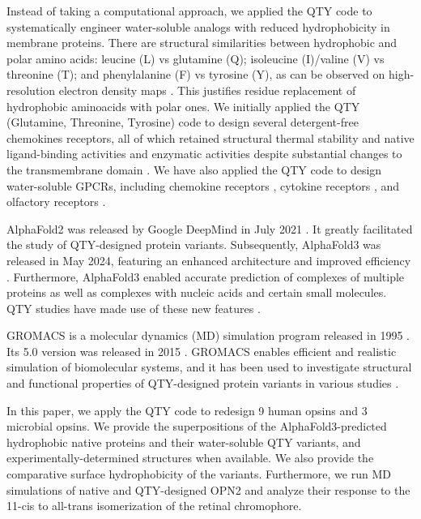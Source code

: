 \documentclass[fleqn,10pt,lineno]{manuscript}
\begin{document}
Instead of taking a computational approach, we applied the QTY code to systematically engineer water-soluble analogs with reduced hydrophobicity in membrane proteins. There are structural similarities between hydrophobic and polar amino acids: leucine (L) vs glutamine (Q); isoleucine (I)/valine (V) vs threonine (T); and phenylalanine (F) vs tyrosine (Y), as can be observed on high-resolution electron density maps \citep{Zhang_2018, Zhang_2022, Tegler_2020}. This justifies residue replacement of hydrophobic aminoacids with polar ones. We initially applied the QTY (Glutamine, Threonine, Tyrosine) code to design several detergent-free chemokines receptors, all of which retained structural thermal stability and native ligand-binding activities and enzymatic activities despite substantial changes to the transmembrane domain \citep{Zhang_2018, Tegler_2020}. We have also applied the QTY code to design water-soluble GPCRs, including chemokine receptors \citep{Zhang_2018, Qing_2019, Tegler_2020, Skuhersky_2021}, cytokine receptors \citep{Hao_2020}, and olfactory receptors \citep{Skuhersky_2021, Johnsson_2025}. 

AlphaFold2 was released by Google DeepMind in July 2021 \citep{Jumper_2021}. It greatly facilitated the study of QTY-designed protein variants. Subsequently, AlphaFold3 was released in May 2024, featuring an enhanced architecture and improved efficiency \citep{Abramson_2024}. Furthermore, AlphaFold3 enabled accurate prediction of complexes of multiple proteins as well as complexes with nucleic acids and certain small molecules. QTY studies have made use of these new features \citep{Chen_2025, Johnsson_2025}. 

GROMACS is a molecular dynamics (MD) simulation program released in 1995 \citep{Berendsen_1995}. Its 5.0 version was released in 2015 \citep{Abraham_2015}. GROMACS enables efficient and realistic simulation of biomolecular systems, and it has been used to investigate structural and functional properties of QTY-designed protein variants in various studies \citep{Karagol_2024, Li_Tang_2024, Smorodina_2024, Li_Wang_2024, Johnsson_2025}. 

In this paper, we apply the QTY code to redesign 9 human opsins and 3 microbial opsins. We provide the superpositions of the AlphaFold3-predicted hydrophobic native proteins and their water-soluble QTY variants, and experimentally-determined structures when available. We also provide the comparative surface hydrophobicity of the variants. Furthermore, we run MD simulations of native and QTY-designed OPN2 and analyze their response to the 11-cis to all-trans isomerization of the retinal chromophore. 
\end{document}

